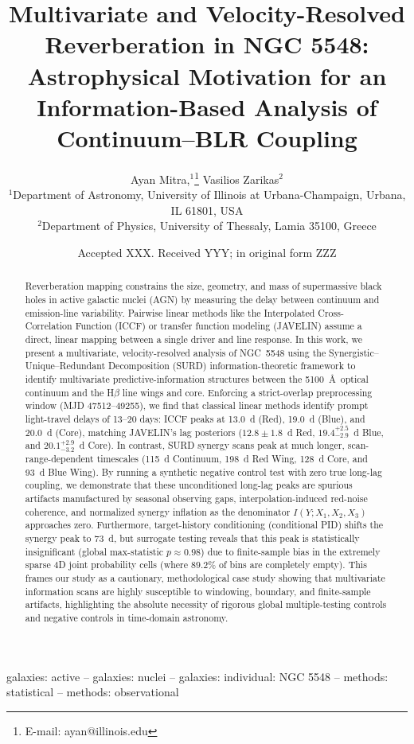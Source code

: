 \documentclass[fleqn,usenatbib]{mnras}
\title[SURD in NGC 5548]{Multivariate and Velocity-Resolved Reverberation in NGC 5548: Astrophysical Motivation for an Information-Based Analysis of Continuum--BLR Coupling}
\author[A. Mitra \& V. Zarikas]{
Ayan Mitra,$^{1}$\thanks{E-mail: ayan@illinois.edu}
Vasilios Zarikas$^{2}$
\\
$^{1}$Department of Astronomy, University of Illinois at Urbana-Champaign, Urbana, IL 61801, USA\\
$^{2}$Department of Physics, University of Thessaly, Lamia 35100, Greece
}
\date{Accepted XXX. Received YYY; in original form ZZZ}
\begin{document}
\label{firstpage}
\pagerange{\pageref{firstpage}--\pageref{lastpage}}
\maketitle

\begin{abstract}
Reverberation mapping constrains the size, geometry, and mass of supermassive black holes in active galactic nuclei (AGN) by measuring the delay between continuum and emission-line variability. Pairwise linear methods like the Interpolated Cross-Correlation Function (ICCF) or transfer function modeling (JAVELIN) assume a direct, linear mapping between a single driver and line response. In this work, we present a multivariate, velocity-resolved analysis of NGC~5548 using the Synergistic--Unique--Redundant Decomposition (SURD) information-theoretic framework to identify multivariate predictive-information structures between the 5100~\AA\ optical continuum and the H\(\beta\) line wings and core. Enforcing a strict-overlap preprocessing window (MJD 47512--49255), we find that classical linear methods identify prompt light-travel delays of 13--20 days: ICCF peaks at 13.0~d (Red), 19.0~d (Blue), and 20.0~d (Core), matching JAVELIN's lag posteriors ($12.8 \pm 1.8$~d Red, $19.4_{-2.9}^{+2.5}$~d Blue, and $20.1_{-3.2}^{+2.9}$~d Core). In contrast, SURD synergy scans peak at much longer, scan-range-dependent timescales (115~d Continuum, 198~d Red Wing, 128~d Core, and 93~d Blue Wing). By running a synthetic negative control test with zero true long-lag coupling, we demonstrate that these unconditioned long-lag peaks are spurious artifacts manufactured by seasonal observing gaps, interpolation-induced red-noise coherence, and normalized synergy inflation as the denominator $I(Y; X_1, X_2, X_3)$ approaches zero. Furthermore, target-history conditioning (conditional PID) shifts the synergy peak to 73~d, but surrogate testing reveals that this peak is statistically insignificant (global max-statistic $p \approx 0.98$) due to finite-sample bias in the extremely sparse 4D joint probability cells (where $89.2\%$ of bins are completely empty). This frames our study as a cautionary, methodological case study showing that multivariate information scans are highly susceptible to windowing, boundary, and finite-sample artifacts, highlighting the absolute necessity of rigorous global multiple-testing controls and negative controls in time-domain astronomy.
\end{abstract}
\begin{keywords}
galaxies: active -- galaxies: nuclei -- galaxies: individual: NGC 5548 -- methods: statistical -- methods: observational
\end{keywords}
\end{document}
